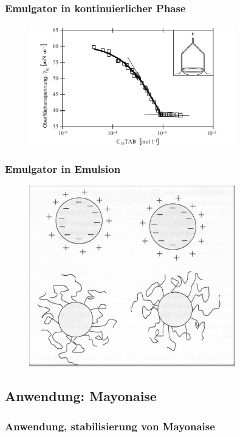 \documentclass{beamer} %
\begin{document}
\begin{frame}
\frametitle{Emulgator in kontinuierlicher Phase}
\begin{figure}
\centering
\includegraphics[width = 0.8\textwidth]{Oberflachenspannung.JPG}
\end{figure}
\end{frame}


\begin{frame}
\frametitle{Emulgator in Emulsion}
\begin{figure}
\centering
\includegraphics[width = 0.8\textwidth]{Wassertropfen.jpg}
\end{figure}
\end{frame}

\subsection{Anwendung: Mayonaise}

\begin{frame}
\frametitle{Anwendung, stabilisierung von Mayonaise}
\end{frame}




\end{document}
